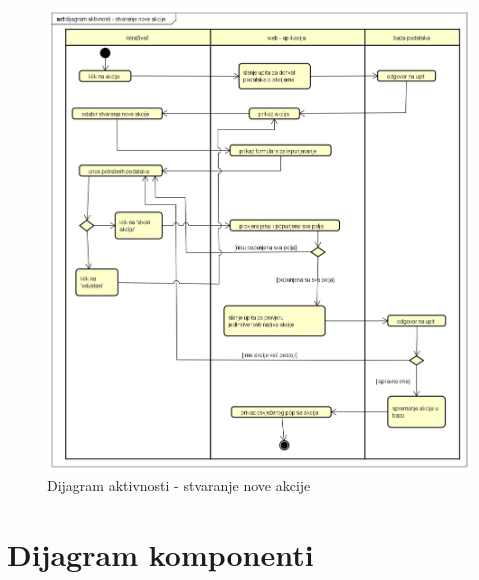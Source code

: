 		\begin{figure}[H]
			\includegraphics[scale=0.5]{slike/dijagram aktivnosti - stvaranje nove akcije.png}
			\centering
			\caption{Dijagram aktivnosti - stvaranje nove akcije}
			\label{fig:dijagram aktivnosti - stvaranje nove akcije}
		\end{figure}

			\eject


		\section{Dijagram komponenti}

